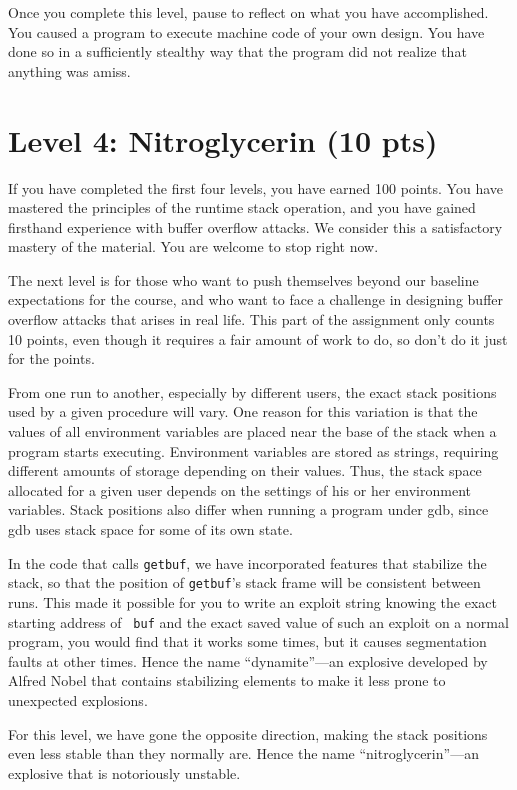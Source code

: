 \documentclass[11pt]{article}
\begin{document}
Once you complete this level, pause to reflect on what you have
accomplished.  You caused a program to execute machine code of your
own design.  You have done so in a sufficiently stealthy way that the program
did not realize that anything was amiss.

\section*{Level 4: Nitroglycerin (10 pts)}

If you have completed the first four levels, you have earned 100
points.  You have mastered the principles of the runtime stack
operation, and you have gained firsthand experience with buffer
overflow attacks.  We consider this a satisfactory mastery of the
material.  You are welcome to stop right now.

The next level is for those who want to push themselves beyond our
baseline expectations for the course, and who want to face a challenge
in designing buffer overflow attacks that arises in real life.  This
part of the assignment only counts 10 points, even though it requires
a fair amount of work to do, so don't do it just for the points.

From one run to another, especially by different users, the exact
stack positions used by a given procedure will vary.  One reason for
this variation is that the values of all environment variables are
placed near the base of the stack when a program starts executing.
Environment variables are stored as strings, requiring different
amounts of storage depending on their values.  Thus, the stack space
allocated for a given user depends on the settings of his or her
environment variables.  Stack positions also differ when running a
program under {\sc gdb}, since {\sc gdb} uses stack space for some of its
own state.

In the code that calls {\tt getbuf}, we have incorporated features
that stabilize the stack, so that the position of {\tt getbuf}'s stack
frame will be consistent between runs.  This made it possible for you
to write an exploit string knowing the exact starting address of {\tt
buf} and the exact saved value of \verb@%ebp@.  If you tried to use
such an exploit on a normal program, you would find that it works some
times, but it causes segmentation faults at other times.  Hence the
name ``dynamite''---an explosive developed by Alfred Nobel that
contains stabilizing elements to make it less prone to unexpected
explosions.

For this level, we have gone the opposite direction, making the stack
positions even less stable than they normally are.  Hence the name
``nitroglycerin''---an explosive that is notoriously unstable.
\end{document}
